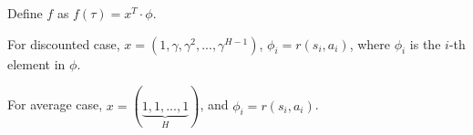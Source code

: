 Define $f$ as $f(\tau)= x^{T} \cdot \phi$. 

For discounted case, $x= (1, \gamma, \gamma^{2},..., \gamma^{H-1})$, $\phi_i=r(s_i, a_i)$, where $\phi_i$ is the $i$-th element in $\phi$. 

For average case, $x= (\underbrace{1, 1,..., 1}_{H})$, and $\phi_i=r(s_i, a_i)$. 







